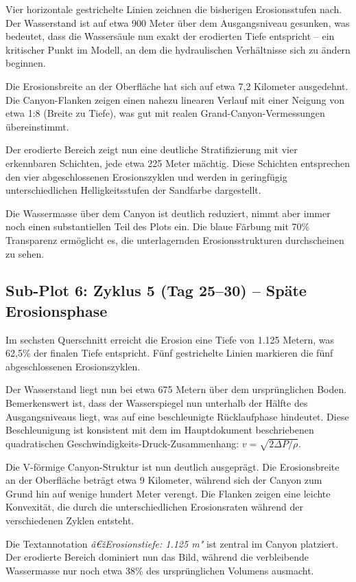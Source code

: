﻿\documentclass[12pt,a4paper]{report}
\begin{document}
Vier horizontale gestrichelte Linien zeichnen die bisherigen Erosionsstufen nach. Der Wasserstand ist auf etwa 900 Meter über dem Ausgangsniveau gesunken, was bedeutet, dass die Wassersäule nun exakt der erodierten Tiefe entspricht -- ein kritischer Punkt im Modell, an dem die hydraulischen Verhältnisse sich zu ändern beginnen.

Die Erosionsbreite an der Oberfläche hat sich auf etwa 7,2 Kilometer ausgedehnt. Die Canyon-Flanken zeigen einen nahezu linearen Verlauf mit einer Neigung von etwa 1:8 (Breite zu Tiefe), was gut mit realen Grand-Canyon-Vermessungen übereinstimmt.

Der erodierte Bereich zeigt nun eine deutliche Stratifizierung mit vier erkennbaren Schichten, jede etwa 225 Meter mächtig. Diese Schichten entsprechen den vier abgeschlossenen Erosionszyklen und werden in geringfügig unterschiedlichen Helligkeitsstufen der Sandfarbe dargestellt.

Die Wassermasse über dem Canyon ist deutlich reduziert, nimmt aber immer noch einen substantiellen Teil des Plots ein. Die blaue Färbung mit 70\% Transparenz ermöglicht es, die unterlagernden Erosionsstrukturen durchscheinen zu sehen.

\subsection{Sub-Plot 6: Zyklus 5 (Tag 25--30) -- Späte Erosionsphase}

Im sechsten Querschnitt erreicht die Erosion eine Tiefe von 1.125 Metern, was 62,5\% der finalen Tiefe entspricht. Fünf gestrichelte Linien markieren die fünf abgeschlossenen Erosionszyklen.

Der Wasserstand liegt nun bei etwa 675 Metern über dem ursprünglichen Boden. Bemerkenswert ist, dass der Wasserspiegel nun unterhalb der Hälfte des Ausgangsniveaus liegt, was auf eine beschleunigte Rücklaufphase hindeutet. Diese Beschleunigung ist konsistent mit dem im Hauptdokument beschriebenen quadratischen Geschwindigkeits-Druck-Zusammenhang: $v = \sqrt{2\Delta P / \rho}$.

Die V-förmige Canyon-Struktur ist nun deutlich ausgeprägt. Die Erosionsbreite an der Oberfläche beträgt etwa 9 Kilometer, während sich der Canyon zum Grund hin auf wenige hundert Meter verengt. Die Flanken zeigen eine leichte Konvexität, die durch die unterschiedlichen Erosionsraten während der verschiedenen Zyklen entsteht.

Die Textannotation \textit{â€žErosionstiefe: 1.125 m"} ist zentral im Canyon platziert. Der erodierte Bereich dominiert nun das Bild, während die verbleibende Wassermasse nur noch etwa 38\% des ursprünglichen Volumens ausmacht.
\end{document}
